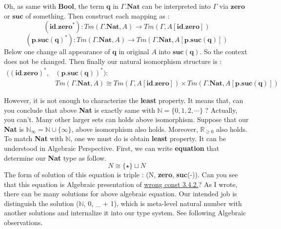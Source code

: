 \documentclass[12pt, a4paper, openany, twoside]{book}
\theoremstyle{definition}
\theoremstyle{remark}
\theoremstyle{plain}
\numberwithin{equation}{section}
\begin{document}
\begin{tcolorbox}[breakable, colback=yellow!10!white,colframe=red!75!black,title=Wrong Construction 3.4.2.]\hypertarget{wrong const 3.4.2.}{}
Oh, as same with \textbf{Bool}, the term $\mathbf{q}$ in $\Gamma.\mathbf{Nat}$ can be interpreted 
into $\Gamma$ via $\mathbf{zero}$ or $\mathbf{suc}$ of something. Then construct each mapping as : 
\[(\mathbf{id.zero}^*) : Tm(\Gamma.\mathbf{Nat}, A) \rightarrow Tm(\Gamma, A[\mathbf{id.zero}])\]
\[(\mathbf{p.suc(q)}^*) : Tm(\Gamma.\mathbf{Nat}, A) \rightarrow Tm(\Gamma.\mathbf{Nat}, A[\mathbf{p.suc(q)}])\]
\noindent Below one change all appearance of $\mathbf{q}$ in original $A$ into $\mathbf{suc}(\mathbf{q})$. 
So the context does not be changed. Then finally our natural isomorphism structure is : 
\begin{align*}
    ((\mathbf{id.zero})^*,& (\mathbf{p.suc(q)})^*) : \\ 
    & Tm(\Gamma.\mathbf{Nat}, A) \cong Tm(\Gamma, A[\mathbf{id.zero}]) \times Tm(\Gamma.\mathbf{Nat}, A[\mathbf{p}.\mathbf{suc}(\mathbf{q})])
\end{align*}
\end{tcolorbox}

\noindent However, it is not enough to characterize the \textbf{least} property. 
It means that, can you conclude that above \textbf{Nat} is exactly same with $\mathbb{N} = \{0, 1, 2, \cdots \}$ ? 
Actually, you can't. Many other larger sets can holds above isomorphism. Suppose that our \textbf{Nat} is $\mathbb{N}_{\infty} = \mathbb{N} \cup \{\infty\}$, 
above isomorphism also holds. Moreover, $\mathbb{R}_{\geq 0}$ also holds. To match \textbf{Nat} with $\mathbb{N}$, 
one we must do is obtain \textbf{least} property. It can be understood in Algebraic Perspective. 
First, we can write \textbf{equation} that determine our \textbf{Nat} type as follow. 
\[N \cong \{\star\} \sqcup N\] 
\noindent The form of solution of this equation is triple : (N, \textbf{zero}, \textbf{suc}(-)).  Can you see that this equation is Algebraic presentation of \hyperlink{wrong const 3.4.2.}{wrong const 3.4.2.}? 
As I wrote, there can be many solutions for above algebraic equation. 
Our intended job is distinguish the solution ($\mathbb{N}$, 0, \_ + 1), which is meta-level natural number 
with another solutions and internalize it into our type system. See following Algebraic observations. 
\end{document}
